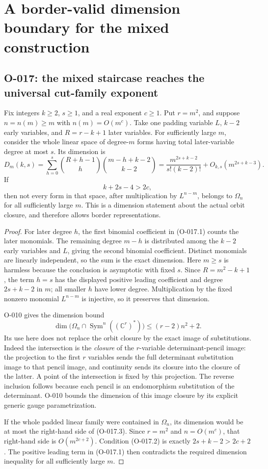 \section{A border-valid dimension boundary for the mixed construction}

\subsection{O-017: the mixed staircase reaches the universal cut-family exponent}
Fix integers $k\geq2$, $s\geq1$, and a real exponent
$c\geq1$. Put $r=m^2$, and suppose $n=n(m)\geq m$
with $n(m)=O(m^c)$. Take one padding variable $L$,
$k-2$ early variables, and $R=r-k+1$ later variables.
For sufficiently large $m$, consider the whole linear space
of degree-$m$ forms having total later-variable degree at
most $s$. Its dimension is
\[
 D_m(k,s)=\sum_{h=0}^s
       \binom{R+h-1}{h}\binom{m-h+k-2}{k-2}
        =\frac{m^{2s+k-2}}{s!(k-2)!}
                                +O_{k,s}(m^{2s+k-3}).    \tag{O-017.1}
\]
If
\[
                            k+2s-4>2c,                 \tag{O-017.2}
\]
then not every form in that space, after multiplication by
$L^{n-m}$, belongs to $\Omega_n$ for all sufficiently large
$m$. This is a dimension statement about the actual orbit
closure, and therefore allows border representations.

\begin{proof}
For later degree $h$, the first binomial coefficient in
(O-017.1) counts the later monomials. The remaining degree
$m-h$ is distributed among the $k-2$ early variables and
$L$, giving the second binomial coefficient. Distinct
monomials are linearly independent, so the sum is the exact
dimension. Here $m\geq s$ is harmless because the conclusion
is asymptotic with fixed $s$. Since $R=m^2-k+1$,
the term $h=s$ has the displayed positive leading coefficient
and degree $2s+k-2$ in $m$; all smaller $h$ have lower
degree. Multiplication by the fixed nonzero monomial
$L^{n-m}$ is injective, so it preserves that dimension.

O-010 gives the dimension bound
\[
 \dim\bigl(\Omega_n\cap\operatorname{Sym}^n((\mathbb C^r)^*)\bigr)
                              \leq (r-2)n^2+2.         \tag{O-017.3}
\]
Its use here does not replace the orbit closure by the exact
image of substitutions. Indeed the intersection is the
\emph{closure} of the $r$-variable determinant-pencil image:
the projection to the first $r$ variables sends the full
determinant substitution image to that pencil image, and
continuity sends its closure into the closure of the latter.
A point of the intersection is fixed by this projection.
The reverse inclusion follows because each pencil is an
endomorphism substitution of the determinant. O-010 bounds
the dimension of this image closure by its explicit generic
gauge parametrization.

If the whole padded linear family were contained in
$\Omega_n$, its dimension would be at most the right-hand
side of (O-017.3). Since $r=m^2$ and $n=O(m^c)$, that
right-hand side is $O(m^{2c+2})$. Condition (O-017.2)
is exactly $2s+k-2>2c+2$. The positive leading term in
(O-017.1) then contradicts the required dimension inequality
for all sufficiently large $m$.
\end{proof}

